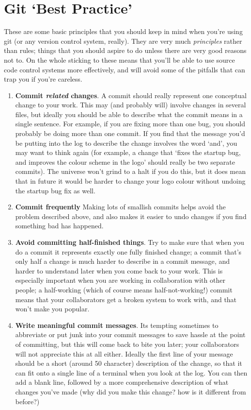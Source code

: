 \section{Git `Best Practice'}

These are some basic principles that you should keep in mind when you're using git (or any version control system, really). They are very much \emph{principles} rather than rules; things that you should aspire to do unless there are very good reasons not to. On the whole sticking to these means that you'll be able to use source code control systems more effectively, and will avoid some of the pitfalls that can trap you if you're careless. 

\begin{enumerate}
\item \textbf{Commit \emph{related} changes}. A commit should really represent one conceptual change to your work. This may (and probably will) involve changes in several files, but ideally you should be able to describe what the commit means in a single sentence. For example, if you are fixing more than one bug, you should probably be doing more than one commit. If you find that the message you'd be putting into the log to describe the change involves the word `and', you may want to think again (for example, a change that `fixes the startup bug, and improves the colour scheme in the logo' should really be two separate commits). The universe won't grind to a halt if you do this, but it does mean that in future it would be harder to change your logo colour without undoing the startup bug fix as well.

\item \textbf{Commit frequently} Making lots of smallish commits helps avoid the problem described above, and also makes it easier to undo changes if you find something bad has happened. 

\item \textbf{Avoid committing half-finished things}. Try to make sure that when you do a commit it represents exactly one fully finished change; a commit that's only half a change is much harder to describe in a commit message, and harder to understand later when you come back to your work. This is especially important when you are working in collaboration with other people; a half-working (which of course means half-not-working!) commit means that your collaborators get a broken system to work with, and that won't make you popular.

\item \textbf{Write meaningful commit messages}. Its tempting sometimes to abbreviate or put junk into your commit messages to save hassle at the point of committing, but this will come back to bite you later; your collaborators will not appreciate this at all either. Ideally the first line of your message should be a short (around 50 character) description of the change, so that it can fit onto a single line of a terminal when you look at the log. You can then add a blank line, followed by a more comprehensive description of what changes you've made (why did you make this change? how is it different from before?)


\end{enumerate}


















